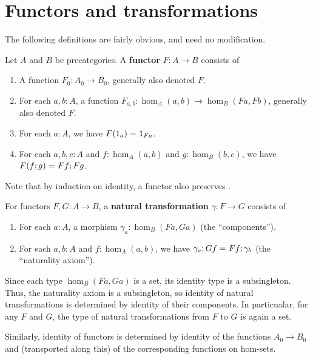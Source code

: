 \section{Functors and transformations}
\label{sec:transfors}

The following definitions are fairly obvious, and need no modification.

\begin{defn}\label{ct:functor}
  Let $A$ and $B$ be precategories.  A \textbf{functor} $F:A\to B$ consists of
  \begin{enumerate}
  \item A function $F_0:A_0\to B_0$, generally also denoted $F$.
  \item For each $a,b:A$, a function $F_{a,b}:\hom_A(a,b) \to \hom_B(Fa,Fb)$, generally also denoted $F$.
  \item For each $a:A$, we have $F(1_a) =_{} 1_{Fa}$.
  \item For each $a,b,c:A$ and $f:\hom_A(a,b)$ and $g:\hom_B(b,c)$, we have $F(f;g) =_{} Ff;Fg$.
  \end{enumerate}
\end{defn}

Note that by induction on identity, a functor also preserves \idtoiso.

\begin{defn}\label{ct:nattrans}
  For functors $F,G:A\to B$, a \textbf{natural transformation} $\gamma:F\to G$ consists of
  \begin{enumerate}
  \item For each $a:A$, a morphism $\gamma_a:\hom_B(Fa,Ga)$ (the ``components'').
  \item For each $a,b:A$ and $f:\hom_A(a,b)$, we have $\gamma_a;Gf =_{} Ff;\gamma_b$ (the ``naturality axiom'').
  \end{enumerate}
\end{defn}

Since each type $\hom_B(Fa,Ga)$ is a set, its identity type is a subsingleton.  Thus, the naturality axiom is a subsingleton, so identity of natural transformations is determined by identity of their components.
In particualar, for any $F$ and $G$, the type of natural transformations from $F$ to $G$ is again a set.

Similarly, identity of functors is determined by identity of the functions $A_0\to B_0$ and (transported along this) of the corresponding functions on hom-sets.

